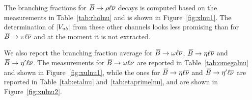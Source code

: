 The branching fractions for 
$\Bb\to \rho\ell\nub$ decays is computed based on the measurements in
Table~\ref{tab:rholnu} and is shown in Figure~\ref{fig:xlnu1}. The determination of $\Vub$
from these other channels looks less promising than for $\Bb\to\pi\ell\nub$ and at the moment it is not extracted.



We also report the branching fraction average for $\Bb\to\omega\ell\nub$, $\Bb\to\eta\ell\nub$ 
and $\Bb\to\eta'\ell\nub$. The measurements for $\Bb\to\omega\ell\nub$ are reported in Table~\ref{tab:omegalnu} 
and shown in Figure~\ref{fig:xulnu1}, while the ones for $\Bb\to\eta\ell\nub$ and  $\Bb\to\eta'\ell\nub$ are reported in Table~\ref{tab:etalnu} and~\ref{tab:etaprimelnu},  and are shown in Figure~\ref{fig:xulnu2}. 





